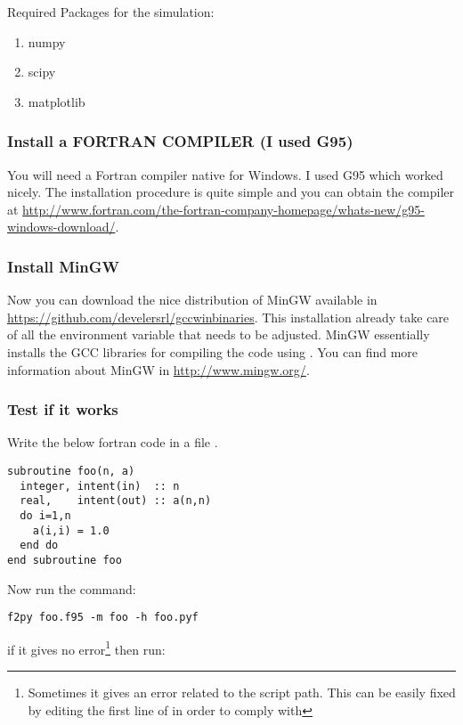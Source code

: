 \documentclass[12pt]{article}
\begin{document}
Required Packages for the simulation:

\begin{enumerate}
\item{numpy}
\item{scipy}
\item{matplotlib}
\end{enumerate}

\subsubsection{Install a FORTRAN COMPILER (I used G95)}

You will need a Fortran compiler native for Windows. I used G95 which worked nicely. The installation procedure is quite simple and you can obtain the compiler at \url{http://www.fortran.com/the-fortran-company-homepage/whats-new/g95-windows-download/}.

\subsubsection{Install MinGW}

Now you can download the nice distribution of MinGW available in \url{https://github.com/develersrl/gccwinbinaries}. This installation already take care of all the environment variable that needs to be adjusted. MinGW essentially installs the GCC libraries for compiling the code using . You can find more information about MinGW in \url{http://www.mingw.org/}.

\subsubsection{Test if it works}

Write the below fortran code in a file .

\begin{verbatim}
subroutine foo(n, a) 
  integer, intent(in)  :: n  
  real,    intent(out) :: a(n,n)
  do i=1,n
    a(i,i) = 1.0
  end do
end subroutine foo
\end{verbatim}

Now run the command:

\begin{verbatim}
f2py foo.f95 -m foo -h foo.pyf
\end{verbatim}
if it gives no error\footnote{Sometimes it gives an error related to the  script path. This can be easily fixed by editing the first line of  in order to comply with } then run:
\end{document}
